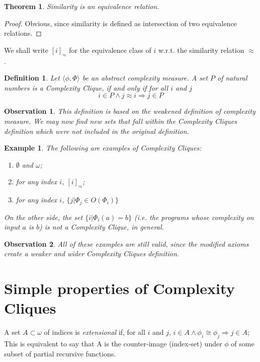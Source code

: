 \documentclass[10pt, a4paper, oneside, titlepage, draft]{article}
\newtheorem{definition}[shrd]{Definition}
\newtheorem{observation}{Observation}[shrd]
\newtheorem{theorem}[shrd]{Theorem}
\newtheorem{example}[shrd]{Example}
\begin{document}
\begin{theorem}
    Similarity is an equivalence relation.
\end{theorem}

\begin{proof}
    Obvious, since similarity is defined as intersection of two equivalence relations.
\end{proof}

\noindent We shall write $[ i ]_{\approx}$ for the equivalence class of $i$ w.r.t. the similarity relation $\approx$.

\begin{definition}
    Let $\langle \phi, \Phi \rangle$ be an abstract complexity measure. A set $P$ of natural numbers is a \emph{Complexity Clique}, if and only if for all $i$ and $j$
    \begin{equation*}
        i \in P \wedge j \approx i \Rightarrow j \in P
    \end{equation*}
\end{definition}

\begin{observation}
    This definition is based on the weakened definition of complexity measure. We may now find new sets that fall within the Complexity Cliques definition which were not included in the original definition.
\end{observation}

\begin{example}
    The following are examples of Complexity Cliques:
    \begin{enumerate}
        \item $\emptyset$ and $\omega$;
        \item for any index $i$, $[i]_{\approx}$;
        \item for any index $i$, $\{ j | \Phi_j \in O(\Phi_i) \}$ 
    \end{enumerate}
    On the other side, the set $ \{ i | \Phi_i(a) = b \} $ (i.e. the programs whose complexity on input $a$ is $b$) is not a Complexity Clique, in general.
\end{example}

\begin{observation}
    All of these examples are still valid, since the modified axioms create a weaker and wider Complexity Cliques definition.
\end{observation}

\section{Simple properties of Complexity Cliques}
A set $A \subset \omega$ of indices is \emph{extensional} if, for all $i$ and $j$, $i \in A \wedge \phi_i \cong \phi_j \Rightarrow j \in A$; This is equivalent to say that A is the counter-image (index-set) under $\phi$ of some subset of partial recursive functions.
\end{document}
